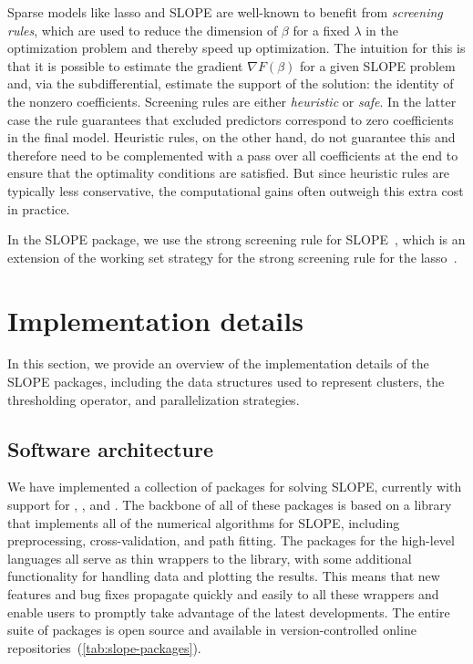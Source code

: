 \documentclass[article]{jss}
\begin{document}
Sparse models like lasso and SLOPE are well-known to benefit from
\emph{screening rules}, which are used to reduce the dimension of \(\beta\) for
a fixed \(\lambda\) in the optimization problem and thereby speed up
optimization. The intuition for this is that it is possible to estimate the
gradient \(\nabla F(\beta) \) for a given SLOPE problem and, via the
subdifferential, estimate the support of the solution: the identity of the
nonzero coefficients. Screening rules are either \emph{heuristic} or
\emph{safe}. In the latter case the rule guarantees that excluded predictors
correspond to zero coefficients in the final model. Heuristic rules, on the
other hand, do not guarantee this and therefore need to be complemented with a
pass over all coefficients at the end to ensure that the optimality conditions
are satisfied. But since heuristic rules are typically less conservative, the
computational gains often outweigh this extra cost in practice.

In the SLOPE package, we use the strong screening rule for
SLOPE~\citep{larsson2020a}, which is an extension of the working set strategy
for the strong screening rule for the lasso~\citep{tibshirani2012}.

\section{Implementation details}
\label{sec:implementation-details}

In this section, we provide an overview of the implementation details of the
SLOPE packages, including the data structures used to represent clusters,
the thresholding operator, and parallelization strategies.

\subsection{Software architecture}

We have implemented a collection of packages for solving SLOPE, currently with
support for , , and . The backbone
of all of these packages is based on a  library that implements
all of the numerical algorithms for SLOPE, including preprocessing,
cross-validation, and path fitting. The packages for the high-level languages
all serve as thin wrappers to the  library, with some additional
functionality for handling data and plotting the results. This means that new
features and bug fixes propagate quickly and easily to all these wrappers and
enable users to promptly take advantage of the latest developments. The entire
suite of packages is open source and available in version-controlled
online repositories~(\autoref{tab:slope-packages}).
\end{document}
